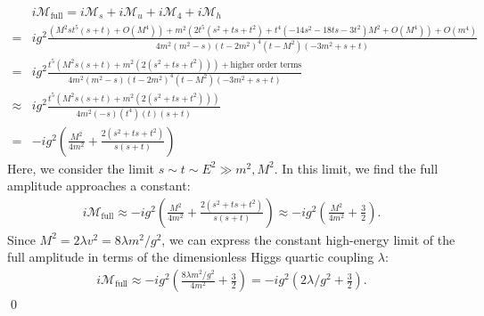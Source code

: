 \begin{align}
    &i \mathcal{M}_\text{full} = i\mathcal{M}_s + i\mathcal{M}_u + i\mathcal{M}_4 + i\mathcal{M}_h\\
    =&ig^2 \frac{\left(M^2 s t^5 (s+t)+O\left(M^4\right)\right)+m^2 \left(2 t^5 \left(s^2+t s+t^2\right)+t^4 \left(-14 s^2-18 t s-3 t^2\right) M^2+O\left(M^4\right)\right)+O\left(m^4\right)}{4 m^2 \left(m^2-s\right) \left(t-2 m^2\right)^4 \left(t-M^2\right) \left(-3 m^2+s+t\right)}\\
    =&ig^2 \frac{t^5\left(M^2 s  (s+t) + m^2(2  \left(s^2+t s+t^2\right)) \right)+\text{higher order terms}}{4 m^2 \left(m^2-s\right) \left(t-2 m^2\right)^4 \left(t-M^2\right) \left(-3 m^2+s+t\right)}\\
    \approx& ig^2 \frac{t^5\left(M^2 s  (s+t) + m^2(2  \left(s^2+t s+t^2\right)) \right)}{4 m^2 (-s)(t^4)(t)(s+t)}\\
    =& -ig^2\left(  \frac{M^2}{4m^2} +\frac{2(s^2+ts+t^2) }{s(s+t)} \right)
\end{align}
Here, we consider the limit $s\sim t \sim E^2 \gg m^2, M^2$. In this limit, we find the full amplitude approaches a constant:
\begin{align}
    i\mathcal{M}_\text{full} \approx -ig^2\left(  \frac{M^2}{4m^2} +\frac{2(s^2+ts+t^2) }{s(s+t)} \right) \approx -ig^2\left(  \frac{M^2}{4m^2} +\frac{3}{2} \right).
\end{align}
Since $M^2 = 2\lambda v^2 = 8\lambda m^2/g^2$, we can express the constant high-energy limit of the full amplitude in terms of the dimensionless Higgs quartic coupling $\lambda$:
\begin{align}
    i\mathcal{M}_\text{full} \approx -ig^2\left(  \frac{8\lambda m^2/g^2}{4m^2} +\frac{3}{2} \right) = -ig^2\left(  2\lambda/g^2 +\frac{3}{2} \right).  
\end{align}
\qed